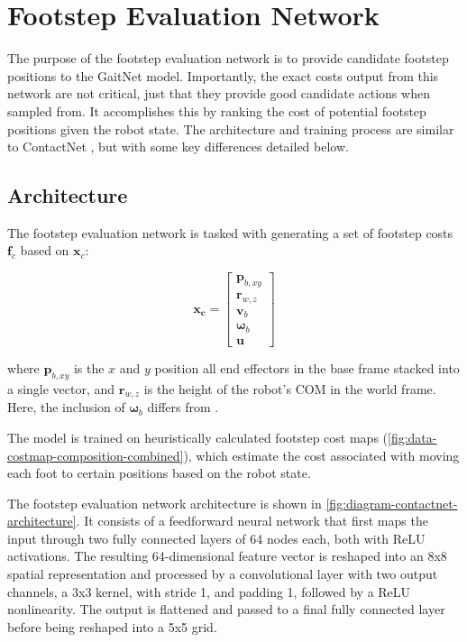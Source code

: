 \section{Footstep Evaluation Network}

The purpose of the footstep evaluation network is to provide
candidate footstep positions to the GaitNet model. Importantly,
the exact costs output from this network are not critical, just that
they provide good candidate actions when sampled from. It accomplishes
this by ranking the cost of potential footstep positions given the
robot state. The architecture and training process are similar to
ContactNet \cite{bratta_contactnet_2024}, but with some key differences
detailed below.

\subsection{Architecture}
\label{sec:contactnet-architecture}

The footstep evaluation network is tasked with generating a set of
footstep costs $\mathbf f_c$ based on $\mathbf x_c$:

\[
  \mathbf{x_c} =
  \begin{bmatrix}
    \mathbf p_{b,xy} \\
    \mathbf r_{w,z} \\
    \mathbf v_b \\
    \mathbf \omega_b \\
    \mathbf u
  \end{bmatrix}
\]

where
$\mathbf p_{b,xy}$ is the $x$ and $y$ position all end effectors in
the base frame stacked into a single vector, and
$\mathbf r_{w,z}$ is the height of the robot's COM in the world frame.
Here, the inclusion of $\mathbf \omega_b$ differs from
\cite{bratta_contactnet_2024}.

The model is trained on heuristically calculated footstep
cost maps (\autoref{fig:data-costmap-composition-combined}), which estimate
the cost associated with moving each foot to certain positions based on the
robot state.

The footstep evaluation network architecture is shown in
\autoref{fig:diagram-contactnet-architecture}. It consists of a
feedforward neural
network that first maps the input through two fully connected layers
of 64 nodes each, both with ReLU activations. The resulting 64-dimensional
feature vector is reshaped into an 8x8 spatial representation and
processed by a convolutional layer with two output channels, a
3x3 kernel, with stride 1, and padding 1, followed by a ReLU
nonlinearity. The output is flattened and passed to a final
fully connected layer before being reshaped into a 5x5 grid.

